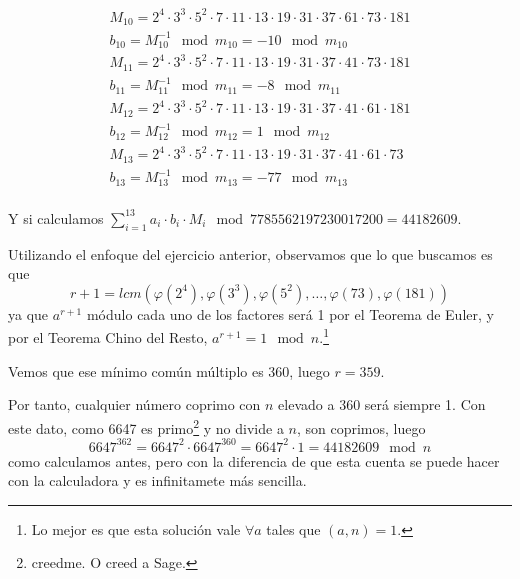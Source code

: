 \begin{problem} [9]
\begin{enumerate}
\begin{align*}
M_{10} = 2^4\cdot3^3\cdot5^2\cdot7\cdot11\cdot13\cdot19\cdot31\cdot37\cdot61\cdot73\cdot181\\
b_{10} = M_{10}^{-1} \mod m_{10} = -10 \mod m_{10}\\
M_{11} = 2^4\cdot3^3\cdot5^2\cdot7\cdot11\cdot13\cdot19\cdot31\cdot37\cdot41\cdot73\cdot181\\
b_{11} = M_{11}^{-1} \mod m_{11} = -8 \mod m_{11}\\
M_{12} = 2^4\cdot3^3\cdot5^2\cdot7\cdot11\cdot13\cdot19\cdot31\cdot37\cdot41\cdot61\cdot181\\
b_{12} = M_{12}^{-1} \mod m_{12} = 1 \mod m_{12}\\
M_{13} = 2^4\cdot3^3\cdot5^2\cdot7\cdot11\cdot13\cdot19\cdot31\cdot37\cdot41\cdot61\cdot73\\
b_{13} = M_{13}^{-1} \mod m_{13} = -77 \mod m_{13}\\
\end{align*}

Y si calculamos $\sum\limits_{i=1}^{13} a_i \cdot b_i \cdot M_i \mod 7785562197230017200 = 44182609$.

\spart

Utilizando el enfoque del ejercicio anterior, observamos que lo que buscamos es que
\[r + 1 = lcm(\varphi(2^4), \varphi(3^3), \varphi(5^2), \dots , \varphi(73), \varphi(181))\]
ya que $a^{r+1}$ módulo cada uno de los factores será 1 por el Teorema de Euler, y por el Teorema Chino del Resto, $a^{r+1} = 1 \mod n$.\footnote{Lo mejor es que esta solución vale $\forall a $ tales que $(a,n)=1$.}

Vemos que ese mínimo común múltiplo es 360, luego $r = 359$.

Por tanto, cualquier número coprimo con $n$ elevado a $360$ será siempre 1. Con este dato, como 6647 es primo\footnote{creedme. O creed a Sage.} y no divide a $n$, son coprimos, luego
\[ 6647^{362} = 6647^{2} \cdot 6647^{360} = 6647^{2} \cdot 1 = 44182609 \mod n \]
como calculamos antes, pero con la diferencia de que esta cuenta se puede hacer con la calculadora y es infinitamete más sencilla.

\end{enumerate}

\end{problem}
